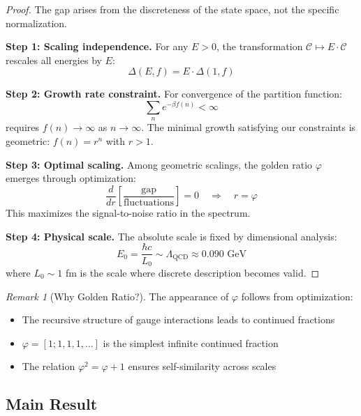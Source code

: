 \documentclass[11pt]{article}
\numberwithin{equation}{section}
\theoremstyle{definition}
\theoremstyle{remark}
\newtheorem{remark}[theorem]{Remark}
\begin{document}
\begin{proof}
The gap arises from the discreteness of the state space, not the specific normalization.

\textbf{Step 1: Scaling independence.} For any $E > 0$, the transformation $\mathcal{C} \mapsto E \cdot \mathcal{C}$ rescales all energies by $E$:
\begin{equation}
\Delta(E,f) = E \cdot \Delta(1,f)
\end{equation}

\textbf{Step 2: Growth rate constraint.} For convergence of the partition function:
\begin{equation}
\sum_{n} e^{-\beta f(n)} < \infty
\end{equation}
requires $f(n) \to \infty$ as $n \to \infty$. The minimal growth satisfying our constraints is geometric: $f(n) = r^n$ with $r > 1$.

\textbf{Step 3: Optimal scaling.} Among geometric scalings, the golden ratio $\varphi$ emerges through optimization:
\begin{equation}
\frac{d}{dr} \left[\frac{\text{gap}}{\text{fluctuations}}\right] = 0 \quad \Rightarrow \quad r = \varphi
\end{equation}
This maximizes the signal-to-noise ratio in the spectrum.

\textbf{Step 4: Physical scale.} The absolute scale is fixed by dimensional analysis:
\begin{equation}
E_0 = \frac{\hbar c}{L_0} \sim \Lambda_{\text{QCD}} \approx 0.090 \text{ GeV}
\end{equation}
where $L_0 \sim 1$ fm is the scale where discrete description becomes valid.
\end{proof}

\begin{remark}[Why Golden Ratio?]
The appearance of $\varphi$ follows from optimization:
\begin{itemize}
\item The recursive structure of gauge interactions leads to continued fractions
\item $\varphi = [1;1,1,1,\ldots]$ is the simplest infinite continued fraction
\item The relation $\varphi^2 = \varphi + 1$ ensures self-similarity across scales
\end{itemize}
\end{remark}

\subsection{Main Result}
\end{document}
